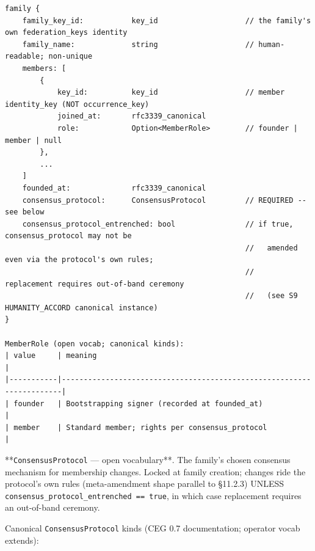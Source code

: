 \documentclass[10pt]{article}
\begin{document}
\begin{lstlisting}
family {
    family_key_id:           key_id                    // the family's own federation_keys identity
    family_name:             string                    // human-readable; non-unique
    members: [
        {
            key_id:          key_id                    // member identity_key (NOT occurrence_key)
            joined_at:       rfc3339_canonical
            role:            Option<MemberRole>        // founder | member | null
        },
        ...
    ]
    founded_at:              rfc3339_canonical
    consensus_protocol:      ConsensusProtocol         // REQUIRED -- see below
    consensus_protocol_entrenched: bool                // if true, consensus_protocol may not be
                                                       //   amended even via the protocol's own rules;
                                                       //   replacement requires out-of-band ceremony
                                                       //   (see S9 HUMANITY_ACCORD canonical instance)
}

MemberRole (open vocab; canonical kinds):
| value     | meaning                                                              |
|-----------|----------------------------------------------------------------------|
| founder   | Bootstrapping signer (recorded at founded_at)                        |
| member    | Standard member; rights per consensus_protocol                       |
\end{lstlisting}

**\texttt{ConsensusProtocol} — open vocabulary**. The family's chosen consensus mechanism for membership changes. Locked at family creation; changes ride the protocol's own rules (meta-amendment shape parallel to §11.2.3) UNLESS \texttt{consensus\_protocol\_entrenched == true}, in which case replacement requires an out-of-band ceremony.


Canonical \texttt{ConsensusProtocol} kinds (CEG 0.7 documentation; operator vocab extends):
\end{document}
